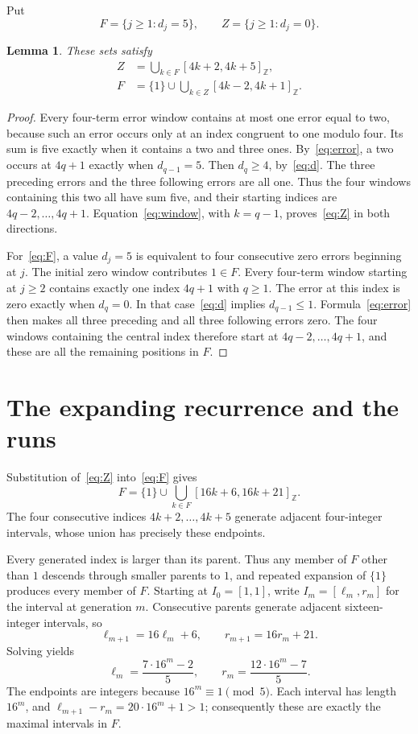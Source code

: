 \documentclass[11pt]{article}
\newtheorem{lemma}[theorem]{Lemma}
\begin{document}
Put
\[
 F=\{j\ge1:d_j=5\},\qquad Z=\{j\ge1:d_j=0\}.
\]
\begin{lemma}\label{lem:sets}
These sets satisfy
\begin{align}
 Z&=\bigcup_{k\in F}[4k+2,4k+5]_{\mathbb Z},\label{eq:Z}\\
 F&=\{1\}\cup\bigcup_{k\in Z}[4k-2,4k+1]_{\mathbb Z}.
 \label{eq:F}
\end{align}
\end{lemma}

\begin{proof}
Every four-term error window contains at most one error equal to two, because
such an error occurs only at an index congruent to one modulo four. Its sum
is five exactly when it contains a two and three ones.
By~\eqref{eq:error}, a two occurs at $4q+1$ exactly when $d_{q-1}=5$.
Then $d_q\ge4$, by~\eqref{eq:d}. The three preceding errors and the three
following errors are all one. Thus the four windows containing this two all
have sum five, and their starting indices are $4q-2,\ldots,4q+1$.
Equation~\eqref{eq:window}, with $k=q-1$, proves~\eqref{eq:Z} in both
directions.

For~\eqref{eq:F}, a value $d_j=5$ is equivalent to four consecutive zero
errors beginning at $j$. The initial zero window contributes $1\in F$.
Every four-term window starting at $j\ge2$ contains exactly one index
$4q+1$ with $q\ge1$. The error at this index is zero exactly when $d_q=0$.
In that case~\eqref{eq:d} implies $d_{q-1}\le1$. Formula~\eqref{eq:error}
then makes all three preceding and all three following errors zero. The
four windows containing the central index therefore start at
$4q-2,\ldots,4q+1$, and these are all the remaining positions in $F$.
\end{proof}

\section{The expanding recurrence and the runs}

Substitution of~\eqref{eq:Z} into~\eqref{eq:F} gives
\begin{equation}\label{eq:recurrence}
 F=\{1\}\cup\bigcup_{k\in F}[16k+6,16k+21]_{\mathbb Z}.
\end{equation}
The four consecutive indices $4k+2,\ldots,4k+5$ generate adjacent
four-integer intervals, whose union has precisely these endpoints.

Every generated index is larger than its parent. Thus any member of $F$
other than $1$ descends through smaller parents to $1$, and repeated
expansion of $\{1\}$ produces every member of $F$. Starting at
$I_0=[1,1]$, write $I_m=[\ell_m,r_m]$ for the interval at generation $m$.
Consecutive parents generate adjacent sixteen-integer intervals, so
\[
 \ell_{m+1}=16\ell_m+6,\qquad r_{m+1}=16r_m+21.
\]
Solving yields
\begin{equation}\label{eq:endpoints}
 \ell_m=\frac{7\cdot16^m-2}{5},\qquad
 r_m=\frac{12\cdot16^m-7}{5}.
\end{equation}
The endpoints are integers because $16^m\equiv1\pmod5$. Each interval has
length $16^m$, and
$\ell_{m+1}-r_m=20\cdot16^m+1>1$; consequently these are exactly the
maximal intervals in $F$.
\end{document}
